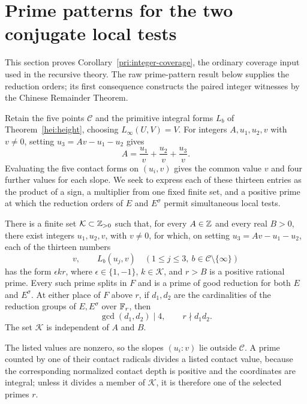 \section{Prime patterns for the two conjugate local tests}
\label{pri:section}

This section proves Corollary~\ref{pri:integer-coverage}, the ordinary
coverage input used in the recursive theory.  The raw prime-pattern result
below supplies the reduction orders; its first consequence constructs the
paired integer witnesses by the Chinese Remainder Theorem.

Retain the five points $\mathcal C$ and the primitive integral forms
$L_b$ of Theorem~\ref{hei:height}, choosing $L_\infty(U,V)=V$.
For integers $A,u_1,u_2,v$ with $v\ne0$, setting $u_3=Av-u_1-u_2$ gives
\[
                         A=\frac{u_1}{v}+\frac{u_2}{v}+\frac{u_3}{v}.
\]
Evaluating the five contact forms on $(u_i,v)$ gives the common value $v$
and four further values for each slope. We seek to express each of these
thirteen entries as the product of a sign, a multiplier from one fixed
finite set, and a positive prime at which the reduction orders of $E$ and
$E^\sigma$ permit simultaneous local tests.

\begin{lemma}\label{pri:pattern}
There is a finite set $\mathcal K\subset\mathbb Z_{>0}$ such that, for every
$A\in\mathbb Z$ and every real $B>0$, there exist integers $u_1,u_2,v$, with
$v\ne0$, for which, on setting $u_3=Av-u_1-u_2$, each of the thirteen
numbers
\begin{equation}\label{pri:forms-list}
       v,\qquad L_b(u_j,v)
       \quad(1\le j\le3,\ b\in\mathcal C\setminus\{\infty\})
\end{equation}
has the form $\epsilon kr$, where $\epsilon\in\{1,-1\}$,
$k\in\mathcal K$, and $r>B$ is a positive rational prime.  Every such
prime splits in $F$ and is a prime of good reduction for both $E$ and
$E^\sigma$.  At either place of $F$ above $r$, if $d_1,d_2$ are the
cardinalities of the reduction groups of $E,E^\sigma$ over $\mathbb F_r$, then
\begin{equation}\label{pri:order-conditions}
                    \gcd(d_1,d_2)\mid4,
                    \qquad r\nmid d_1d_2.
\end{equation}
The set $\mathcal K$ is independent of $A$ and $B$.
\end{lemma}

The listed values are nonzero, so the slopes $(u_i:v)$ lie outside
$\mathcal C$. A prime counted by one of their contact radicals divides a
listed contact value, because the corresponding normalized contact depth
is positive and the coordinates are integral; unless it divides a member
of $\mathcal K$, it is therefore one of the selected primes $r$.

